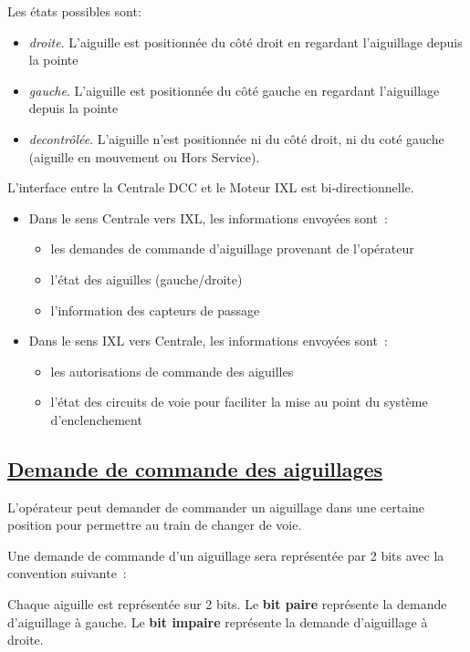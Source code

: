 Les états possibles sont:

\begin{itemize}
\item \emph{droite}. L'aiguille est positionnée du côté droit en regardant
l'aiguillage depuis la pointe
\item \emph{gauche}. L'aiguille est positionnée du côté gauche en regardant
l'aiguillage depuis la pointe
\item \emph{decontrôlée}. L'aiguille n'est positionnée ni du côté droit, 
ni du coté gauche (aiguille en mouvement ou Hors Service).
\end{itemize}

\newpage

L'interface entre la Centrale DCC et le Moteur IXL est bi-directionnelle. 

\begin{itemize}
\item Dans le sens Centrale vers IXL, les informations envoyées sont~:
  \begin{itemize}
  \item les demandes de commande d'aiguillage provenant de l'opérateur
  \item l'état des aiguilles (gauche/droite)
  \item l'information des capteurs de passage
  \end{itemize}

\item Dans le sens IXL vers Centrale, les informations envoyées sont~:
  \begin{itemize}
  \item les autorisations de commande des aiguilles
  \item l'état des circuits de voie pour faciliter la mise au point 
  du système d'enclenchement
  \end{itemize}
\end{itemize}


\subsection{\underline{Demande de commande des aiguillages}}
\label{sec:ixl_dem_aig}

L'opérateur peut demander de commander un aiguillage dans une certaine
position pour permettre au train de changer de voie.

Une demande de commande d'un aiguillage sera représentée par
2 bits avec la convention suivante~:

Chaque aiguille est représentée sur 2 bits. Le \textbf{bit paire} représente la
demande d'aiguillage à gauche. Le \textbf{bit impaire} représente la demande
d'aiguillage à droite.

